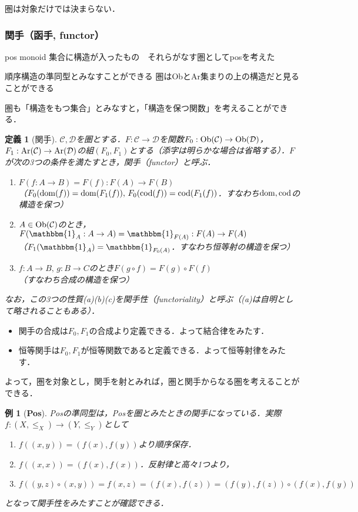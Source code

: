 \documentclass[dvipdfmx,a4j,10pt]{jsarticle}
\theoremstyle{mystyle1}
\theoremstyle{mystyle2}
\newtheorem{dfn*}{定義}
\newtheorem{example}{例}
\theoremstyle{mystyle3}
\renewcommand{\labelenumi}{\ensuremath{\blacksquare}}
\renewcommand{\labelenumi}{(\arabic{enumi})}%
\newcommand{\Ob}{{\rm Ob}}
\newcommand{\Ar}{{\rm Ar}}
\newcommand{\dom}{{\rm dom}}
\newcommand{\cod}{{\rm cod}}
\begin{document}
圏は対象だけでは決まらない．

\subsubsection{関手（函手, functor）}
pos monoid 集合に構造が入ったもの　それらがなす圏としてposを考えた

順序構造の準同型とみなすことができる
圏はObとAr集まりの上の構造だと見ることができる

圏も「構造をもつ集合」とみなすと，「構造を保つ関数」を考えることができる．

\begin{dfn*}[関手]
    $\mathcal{C},\mathcal{D}$を圏とする．$F:\mathcal{C}\to\mathcal{D}$を関数$F_0:\Ob(\mathcal{C})\to\Ob(\mathcal{D})$，$F_1:\Ar(\mathcal{C})\to\Ar(\mathcal{D})$の組$(F_0,F_1)$とする（添字は明らかな場合は省略する）．$F$が次の3つの条件を満たすとき，関手（functor）と呼ぶ．
    \begin{enumerate}\renewcommand{\labelenumi}{(\alph{enumi})}
        \item $F(f:A\to B)=F(f):F(A)\to F(B)$\\
              （$F_0(\dom(f))=\dom(F_1(f)),\,F_0(\cod(f))=\cod(F_1(f))$．すなわち$\dom,\cod$の構造を保つ）
        \item $A\in\Ob(\mathcal{C})$のとき，$F(\mathbbm{1}_A:A\to A)=\mathbbm{1}_{F(A)}:F(A)\to F(A)$\\
              （$F_1(\mathbbm{1}_A)=\mathbbm{1}_{F_0(A)}$．すなわち恒等射の構造を保つ）
        \item $f:A\to B,\, g:B\to C$のとき$F(g\circ f)=F(g)\circ F(f)$\\
              （すなわち合成の構造を保つ）
    \end{enumerate}
    なお，この3つの性質(a)(b)(c)を関手性（functoriality）と呼ぶ（(a)は自明として略されることもある）．
\end{dfn*}

\begin{itemize}
    \item 関手の合成は$F_0,F_1$の合成より定義できる．よって結合律をみたす．
    \item 恒等関手は$F_0,F_1$が恒等関数であると定義できる．よって恒等射律をみたす．
\end{itemize}
よって，圏を対象とし，関手を射とみれば，圏と関手からなる圏を考えることができる．

\begin{example}[\textbf{Pos}]
    Posの準同型は，Posを圏とみたときの関手になっている．実際$f:(X,\leq_X)\to (Y,\leq_Y)$として
    \begin{enumerate}\renewcommand{\labelenumi}{(\alph{enumi})}
        \item $f((x,y))=(f(x),f(y))$より順序保存．
        \item $f((x,x))=(f(x),f(x))$．反射律と高々1つより，
        \item $f((y,z)\circ (x,y))=f(x,z)=(f(x),f(z))=(f(y),f(z))\circ (f(x),f(y))$
    \end{enumerate}
    となって関手性をみたすことが確認できる．
\end{example}
\end{document}
